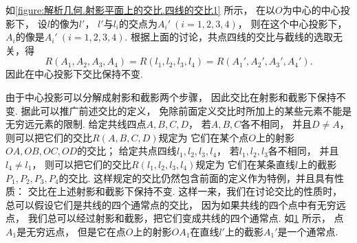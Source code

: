如\cref{figure:解析几何.射影平面上的交比.四线的交比1} 所示，
在以\(O\)为中心的中心投影下，
设\(l\)的像为\(l'\)，
\(l'\)与\(l_i\)的交点为\(A_i'\ (i=1,2,3,4)\)，
则在这个中心投影下，
\(A_i\)的像是\(A_i'\ (i=1,2,3,4)\).
根据上面的讨论，共点四线的交比与截线的选取无关，得\begin{equation*}
	R(A_1,A_2,A_3,A_4)
	= R(l_1,l_2,l_3,l_4)
	= R(A_1',A_2',A_3',A_4').
\end{equation*}
因此在中心投影下交比保持不变.

由于中心投影可以分解成射影和截影两个步骤，
因此交比在射影和截影下保持不变.
据此可以推广前述交比的定义，
免除前面定义交比时所加上的某些元素不能是无穷远元素的限制.
给定共线四点\(A,B,C,D\)，
若\(A,B,C\)各不相同，
并且\(D \neq A\)，
则可以把它们的交比\(R(A,B,C,D)\)规定为
它们在某个点\(O\)上的射影\(OA,OB,OC,OD\)的交比；
给定共点四线\(l_1,l_2,l_3,l_4\)，
若\(l_1,l_2,l_3\)各不相同，
并且\(l_4 \neq l_1\)，
则可以把它们的交比\(R(l_1,l_2,l_3,l_4)\)规定为
它们在某条直线\(l\)上的截影\(P_1,P_2,P_3,P_4\)的交比.
这样规定的交比仍然包含前面的定义作为特例，并且具有性质：
交比在上述射影和截影下保持不变.
这样一来，我们在讨论交比的性质时，
总可以假设它们是共线的四个通常点的交比，
因为如果共线的四个点中有无穷远点，
我们总可以经过射影和截影，把它们变成共线的四个通常点.
如\cref{figure:解析几何.射影平面上的交比.四线的交比2} 所示，
点\(A_1\)是无穷远点，
但是它在点\(O\)上的射影\(OA_1\)在直线\(l'\)上的截影\(A_1'\)是一个通常点.

\begin{figure}[hbt]
	\centering
	\caption{}
	\label{figure:解析几何.射影平面上的交比.四线的交比2}
\end{figure}

